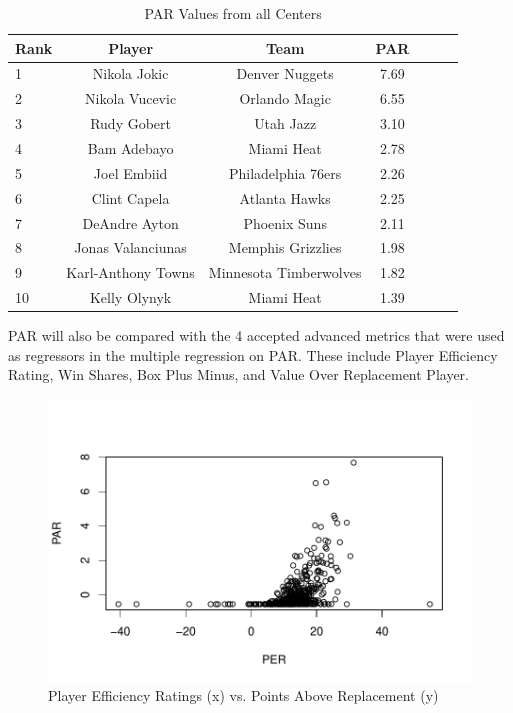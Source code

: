 \documentclass[titlepage, 12pt]{article}
\begin{document}
\begin{table}[tbp]
  \caption{PAR Values from all Centers}
  \label{tab:Ctable}
\centering
\begin{tabular}[t]{lcccccc}
  \toprule
  Rank & Player & Team & PAR\\
  \midrule
 1 & Nikola Jokic & Denver Nuggets & 7.69\\
 2 & Nikola Vucevic & Orlando Magic & 6.55\\
 3 & Rudy Gobert & Utah Jazz & 3.10\\
 4 & Bam Adebayo & Miami Heat & 2.78\\
 5 & Joel Embiid & Philadelphia 76ers & 2.26\\
 6 & Clint Capela & Atlanta Hawks & 2.25\\
 7 & DeAndre Ayton & Phoenix Suns & 2.11\\
 8 & Jonas Valanciunas & Memphis Grizzlies & 1.98\\
 9 & Karl-Anthony Towns & Minnesota Timberwolves & 1.82\\
 10 & Kelly Olynyk & Miami Heat & 1.39\\
  \bottomrule
\end{tabular}
\end{table}

PAR will also be compared with the 4 accepted advanced metrics that 
were used as regressors in the 
multiple regression on PAR. These include Player Efficiency Rating, Win 
Shares, Box Plus Minus, and 
Value Over Replacement Player.

\begin{figure}[tbp]
  \centering
  \includegraphics[width=\textwidth]{PERvsPAR}
  \caption{Player Efficiency Ratings (x) vs. Points Above Replacement (y)}
  \label{fig:Fig1}
\end{figure}
\end{document}
